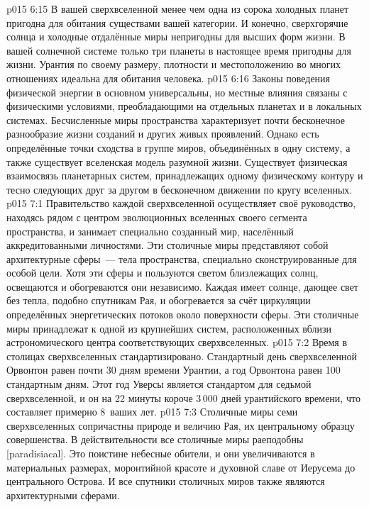 \vs p015 6:15 В вашей сверхвселенной менее чем одна из сорока холодных планет пригодна для обитания существами вашей категории. И конечно, сверхгорячие солнца и холодные отдалённые миры непригодны для высших форм жизни. В вашей солнечной системе только три планеты в настоящее время пригодны для жизни. Урантия по своему размеру, плотности и местоположению во многих отношениях идеальна для обитания человека.
\vs p015 6:16 Законы поведения физической энергии в основном универсальны, но местные влияния связаны с физическими условиями, преобладающими на отдельных планетах и в локальных системах. Бесчисленные миры пространства характеризует почти бесконечное разнообразие жизни созданий и других живых проявлений. Однако есть определённые точки сходства в группе миров, объединённых в одну систему, а также существует вселенская модель разумной жизни. Существует физическая взаимосвязь планетарных систем, принадлежащих одному физическому контуру и тесно следующих друг за другом в бесконечном движении по кругу вселенных.
\vs p015 7:1 Правительство каждой сверхвселенной осуществляет своё руководство, находясь рядом с центром эволюционных вселенных своего сегмента пространства, и занимает специально созданный мир, населённый аккредитованными личностями. Эти столичные миры представляют собой архитектурные сферы~--- тела пространства, специально сконструированные для особой цели. Хотя эти сферы и пользуются светом близлежащих солнц, освещаются и обогреваются они независимо. Каждая имеет солнце, дающее свет без тепла, подобно спутникам Рая, и обогревается за счёт циркуляции определённых энергетических потоков около поверхности сферы. Эти столичные миры принадлежат к одной из крупнейших систем, расположенных вблизи астрономического центра соответствующих сверхвселенных.
\vs p015 7:2 \pc Время в столицах сверхвселенных стандартизировано. Стандартный день сверхвселенной Орвонтон равен почти 30 дням времени Урантии, а год Орвонтона равен 100 стандартным дням. Этот год Уверсы является стандартом для седьмой сверхвселенной, и он на 22 минуты короче 3\,000 дней урантийского времени, что составляет примерно 8\, ваших лет.
\vs p015 7:3 \pc Столичные миры семи сверхвселенных сопричастны природе и величию Рая, их центральному образцу совершенства. В действительности все столичные миры раеподобны [paradisiacal]. Это поистине небесные обители, и они увеличиваются в материальных размерах, моронтийной красоте и духовной славе от Иерусема до центрального Острова. И все спутники столичных миров также являются архитектурными сферами.
